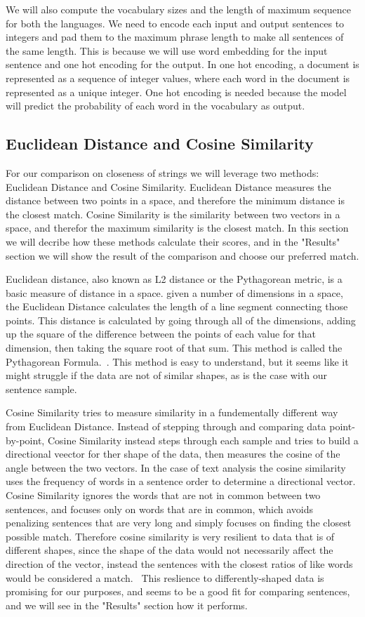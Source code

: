 \documentclass[runningheads]{llncs}
\begin{document}
	We will also compute the vocabulary sizes and the length of maximum sequence for both the languages. We need to encode each input and output sentences to integers and  pad them to the maximum phrase length to make all sentences of the same length. This is because we will use word embedding for the input sentence and one hot encoding for the output. In one hot encoding, a document is represented as a sequence of integer values, where each word in the document is represented as a unique integer. One hot encoding is needed because the model will predict the probability of each word in the vocabulary as output.	

	\subsection{Euclidean Distance and Cosine Similarity}	
	For our comparison on closeness of strings we will leverage two methods: Euclidean Distance and Cosine Similarity. Euclidean Distance measures the distance between two points in a space, and therefore the minimum distance is the closest match. Cosine Similarity is the similarity between two vectors in a space, and therefor the maximum similarity is the closest match. In this section we will decribe how these methods calculate their scores, and in the "Results" section we will show the result of the comparison and choose our preferred match.
	
Euclidean distance, also known as L2 distance or the Pythagorean metric, is a basic measure of distance in a space. given a number of dimensions in a space, the Euclidean Distance calculates the length of a line segment connecting those points. This distance is calculated by going through all of the dimensions, adding up the square of the difference between the points of each value for that dimension, then taking the square root of that sum. This method is called the Pythagorean Formula.~\cite{ref_url19}. This method is easy to understand, but it seems like it might struggle if the data are not of similar shapes, as is the case with our sentence sample.

Cosine Similarity tries to measure similarity in a fundementally different way from Euclidean Distance. Instead of stepping through and comparing data point-by-point, Cosine Similarity instead steps through each sample and tries to build a directional veector for ther shape of the data, then measures the cosine of the angle between the two vectors. In the case of text analysis the cosine similarity uses the frequency of words in a sentence order to determine a directional vector. Cosine Similarity ignores the words that are not in common between two sentences, and focuses only on words that are in common, which avoids penalizing sentences that are very long and simply focuses on finding the closest possible match. Therefore cosine similarity is very resilient to data that is of different shapes, since the shape of the data would not necessarily affect the direction of the vector, instead the sentences with the closest ratios of like words would be considered a match.~\cite{ref_book1} This reslience to differently-shaped data is promising for our purposes, and seems to be a good fit for comparing sentences, and we will see in the "Results" section how it performs.
\end{document}
